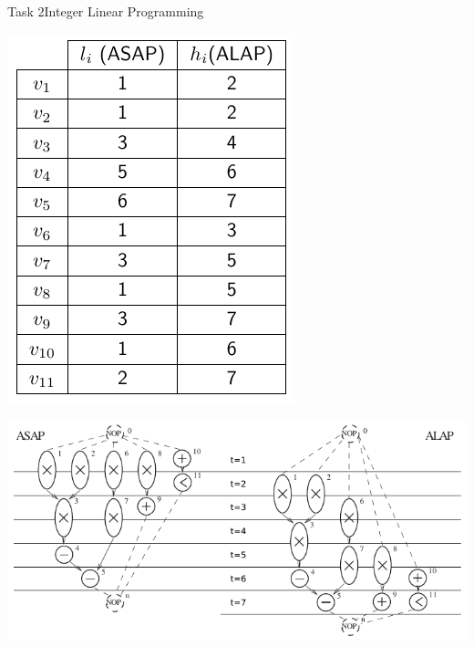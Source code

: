 \begin{frame}[allowframebreaks]{Task 2}{Integer Linear Programming}
\begin{solution}
    \centering
    \includegraphics[height=0.6\paperheight]{./figures/task2_earliest_and_latest_starting_times.png}
  \end{solution}
  \begin{solutionnoinc}
    \includegraphics[width=\textwidth]{./figures/task2_scheduling_with_asap_and_alap.png}
  \end{solutionnoinc}
\end{frame}
